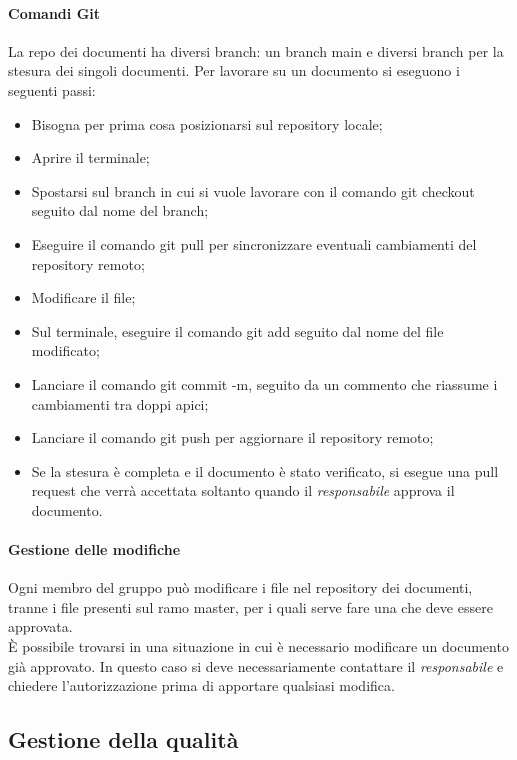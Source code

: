 \documentclass[../norme_di_progetto.tex]{subfiles}
\begin{document}
\paragraph{Comandi Git}
La repo dei documenti ha diversi branch: un branch main e diversi branch per la stesura dei singoli documenti. Per lavorare su un documento si eseguono i seguenti passi:
\begin{itemize}
    \item Bisogna per prima cosa posizionarsi sul repository locale;
    \item Aprire il terminale;
    \item Spostarsi sul branch in cui si vuole lavorare con il comando git checkout seguito dal nome del branch;
    \item Eseguire il comando git pull per sincronizzare eventuali cambiamenti del repository remoto;
    \item Modificare il file;
    \item Sul terminale, eseguire il comando git add seguito dal nome del file modificato;
    \item Lanciare il comando git commit -m, seguito da un commento che riassume i cambiamenti tra doppi apici;
    \item Lanciare il comando git push per aggiornare il repository remoto;
    \item Se la stesura è completa e il documento è stato verificato, si esegue una pull request che verrà accettata soltanto quando il \emph{responsabile} approva il documento.
\end{itemize}

\paragraph{Gestione delle modifiche}
Ogni membro del gruppo può modificare i file nel repository dei documenti, tranne i file presenti sul ramo master, per i quali serve fare una  che deve essere approvata.\\
È possibile trovarsi in una situazione in cui è necessario modificare un documento già approvato. In questo caso si deve necessariamente contattare il \emph{responsabile} e chiedere l'autorizzazione prima di apportare qualsiasi modifica.

\subsection{Gestione della qualità}
\end{document}
